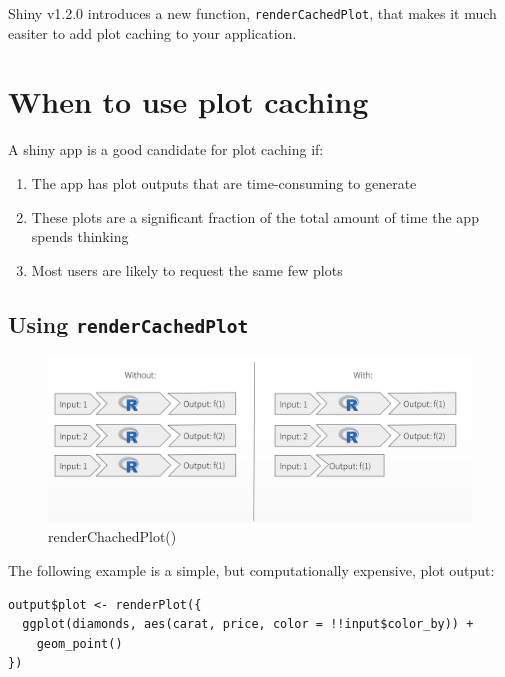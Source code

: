 \documentclass[]{book}
\providecommand{\tightlist}{%
  \setlength{\itemsep}{0pt}\setlength{\parskip}{0pt}}
\theoremstyle{definition}
\theoremstyle{definition}
\theoremstyle{definition}
\theoremstyle{remark}
\begin{document}
Shiny v1.2.0 introduces a new function, \texttt{renderCachedPlot}, that
makes it much easiter to add plot caching to your application.

\hypertarget{when-to-use-plot-caching}{%
\section{When to use plot caching}\label{when-to-use-plot-caching}}

A shiny app is a good candidate for plot caching if:

\begin{enumerate}
\def\labelenumi{\arabic{enumi}.}
\tightlist
\item
  The app has plot outputs that are time-consuming to generate
\item
  These plots are a significant fraction of the total amount of time the
  app spends thinking
\item
  Most users are likely to request the same few plots
\end{enumerate}

\hypertarget{using-rendercachedplot}{%
\subsection{\texorpdfstring{Using
\texttt{renderCachedPlot}}{Using renderCachedPlot}}\label{using-rendercachedplot}}

\begin{figure}
\centering
\includegraphics{imgs/plotcaching/rendercachedplot.png}
\caption{renderChachedPlot()}
\end{figure}

The following example is a simple, but computationally expensive, plot
output:

\begin{verbatim}
output$plot <- renderPlot({
  ggplot(diamonds, aes(carat, price, color = !!input$color_by)) +
    geom_point()
})
\end{verbatim}
\end{document}
